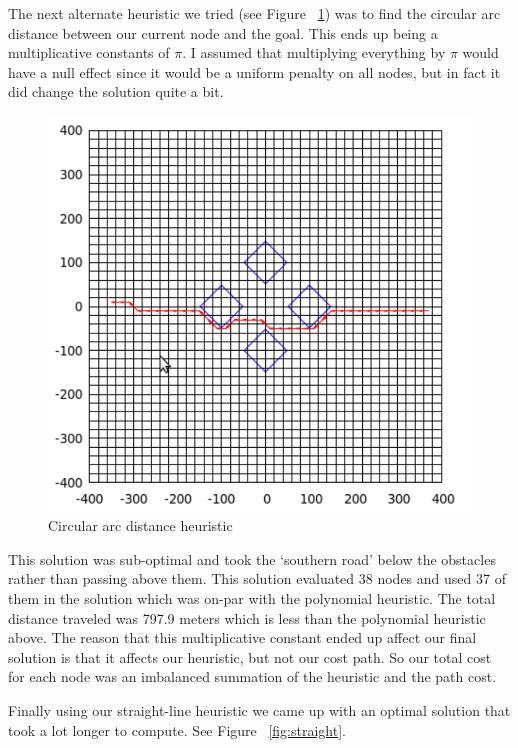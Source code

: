 \par
The next alternate heuristic we tried (see Figure ~\ref{fig:circ}) was to find the circular arc distance between our current node and the goal.  This ends up being a multiplicative constants of $\pi$.  I assumed that multiplying everything by $\pi$ would have a null effect since it would be a uniform penalty on all nodes, but in fact it did change the solution quite a bit.
\begin{figure}\label{fig:circ}
\begin{center}
\includegraphics[width=\textwidth]{heur2.png}
\caption{Circular arc distance heuristic}
\end{center}
\end{figure}
This solution was sub-optimal and took the `southern road' below the obstacles rather than passing above them.  This solution evaluated 38 nodes and used 37 of them in the solution which was on-par with the polynomial heuristic.  The total distance traveled was 797.9 meters which is less than the polynomial heuristic above.  The reason that this multiplicative constant ended up affect our final solution is that it affects our heuristic, but not our cost path.  So our total cost for each node was an imbalanced summation of the heuristic and the path cost.
\par
Finally using our straight-line heuristic we came up with an optimal solution that took a lot longer to compute.  See Figure ~\ref{fig:straight}.

